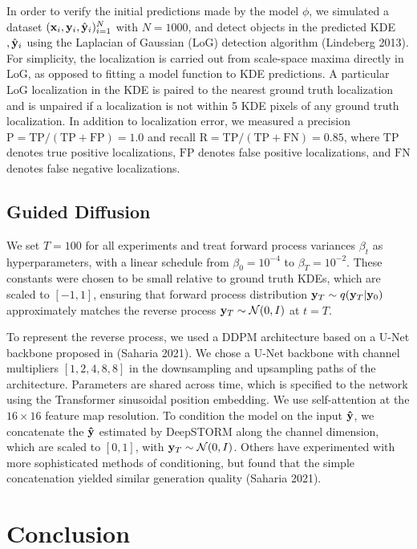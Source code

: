 \documentclass{article}
\begin{document}
In order to verify the initial predictions made by the model $\phi$, we simulated a dataset $(\bold{x}_i,\bold{y}_i,\hat{\bold{y}}_{i})_{i=1}^{N}$ with $N=1000$, and  detect objects in the predicted KDE $,\hat{\bold{y}}_{i}$ using the Laplacian of Gaussian (LoG) detection algorithm (Lindeberg 2013). For simplicity, the localization is carried out from scale-space maxima directly in LoG, as opposed to fitting a model function to KDE predictions. A particular LoG localization in the KDE is paired to the nearest ground truth localization and is unpaired if a localization is not within 5 KDE pixels of any ground truth localization. In addition to localization error, we measured a precision $\mathrm{P = TP/(TP + FP)} = 1.0$ and recall $\mathrm{R = TP/(TP + FN)} = 0.85$, where $\mathrm{TP}$ denotes true positive localizations, $\mathrm{FP}$ denotes false positive localizations, and $\mathrm{FN}$ denotes false negative localizations.

\subsection{Guided Diffusion}

We set $T = 100$ for all experiments and treat forward process variances $\beta_{t}$ as hyperparameters, with a linear schedule from $\beta_{0}=10^{-4}$ to $\beta_{T}=10^{-2}$.
These constants were chosen to be small relative to ground truth KDEs, which are scaled to $[-1,1]$, ensuring that forward process distribution $\bold{y}_{T}\sim q(\bold{y}_{T}|\bold{y}_{0})$ approximately matches the reverse process $\bold{y}_T\sim \mathcal{N}(0, I)$ at $t=T$.

To represent the reverse process, we used a DDPM architecture based on a U-Net backbone proposed in (Saharia 2021). We chose a U-Net backbone with channel multipliers $[1,2,4,8,8]$ in the downsampling and upsampling paths of the architecture. Parameters are shared across time, which is specified to the network using the Transformer sinusoidal position embedding. We use self-attention at the $16 \times 16$ feature map resolution. To condition the model on the input $\bold{\hat{y}}$, we concatenate the $\bold{\hat{y}}$ estimated by DeepSTORM along the channel dimension, which are scaled to $[0,1]$, with $\bold{y}_T\sim \mathcal{N}(0, I)$. Others have experimented with more sophisticated methods of conditioning, but found that the simple concatenation yielded similar generation quality (Saharia 2021). 


\section{Conclusion}
\end{document}
